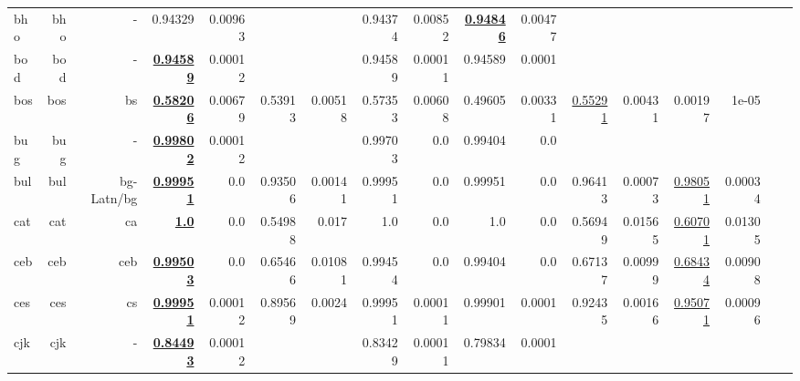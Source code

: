 \documentclass[11pt]{article}
\begin{document}
\begin{table*}[h]
{\begin{tabular}{lrrrrrrrrrrrrrrrr}
bho         & bho         & -         & 0.94329         & 0.00963         &          &          & 0.94374         & 0.00852         & \textbf{\underline{0.94846}}         & 0.00477         &          &          &          &          \\
bod         & bod         & -         & \textbf{\underline{0.94589}}         & 0.00012         &          &          & 0.94589         & 0.00011         & 0.94589         & 0.0001         &          &          &          &          \\
bos         & bos         & bs         & \textbf{\underline{0.58206}}         & 0.00679         & 0.53913         & 0.00518         & 0.57353         & 0.00608         & 0.49605         & 0.00331         & \underline{0.55291}         & 0.00431         & 0.00197         & 1e-05         \\
bug         & bug         & -         & \textbf{\underline{0.99802}}         & 0.00012         &          &          & 0.99703         & 0.0         & 0.99404         & 0.0         &          &          &          &          \\
bul         & bul         & bg-Latn/bg         & \textbf{\underline{0.99951}}         & 0.0         & 0.93506         & 0.00141         & 0.99951         & 0.0         & 0.99951         & 0.0         & 0.96413         & 0.00073         & \underline{0.98051}         & 0.00034         \\
cat         & cat         & ca         & \textbf{\underline{1.0}}         & 0.0         & 0.54988         & 0.017         & 1.0         & 0.0         & 1.0         & 0.0         & 0.56949         & 0.01565         & \underline{0.60701}         & 0.01305         \\
ceb         & ceb         & ceb         & \textbf{\underline{0.99503}}         & 0.0         & 0.65466         & 0.01081         & 0.99454         & 0.0         & 0.99404         & 0.0         & 0.67137         & 0.00999         & \underline{0.68434}         & 0.00908         \\
ces         & ces         & cs         & \textbf{\underline{0.99951}}         & 0.00012         & 0.89569         & 0.0024         & 0.99951         & 0.00011         & 0.99901         & 0.0001         & 0.92435         & 0.00166         & \underline{0.95071}         & 0.00096         \\
cjk         & cjk         & -         & \textbf{\underline{0.84493}}         & 0.00012         &          &          & 0.83429         & 0.00011         & 0.79834         & 0.0001         &          &          &          &          \\

\end{tabular}}
\end{table*}
\end{document}
